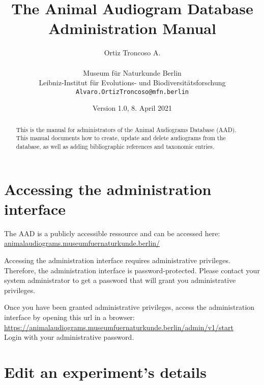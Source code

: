 \documentclass{article}
\begin{document}
\title{The Animal Audiogram Database Administration Manual}
\author{Ortiz Troncoso A.\\ \\
  Museum f{\"u}r Naturkunde Berlin\\Leibniz-Institut f{\"u}r Evolutions- und Biodiversitätsforschung\\
  \texttt{Alvaro.OrtizTroncoso@mfn.berlin}
}
\date{Version 1.0, 8. April 2021}

\maketitle

\begin{abstract}
  This is the manual for administrators of the Animal Audiograms Database (AAD). This manual documents how to create, update and delete audiograms from the database, as well as adding bibliographic references and taxonomic entries.
\end{abstract}

\tableofcontents

\section{Accessing the administration interface}
The AAD is a publicly accessible ressource and can be accessed here:\\ \url{animalaudiograms.museumfuernaturkunde.berlin/}

Accessing the administration interface requires administrative privileges. Therefore, the administration interface is password-protected. Please contact your system administrator to get a password that will grant you administrative privileges.

Once you have been granted administrative privileges, access the administration interface by opening this url in a browser:\\
\url{https://animalaudiograms.museumfuernaturkunde.berlin/admin/v1/start}\\
Login with your administrative password.


\section{Edit an experiment's details}
\end{document}
